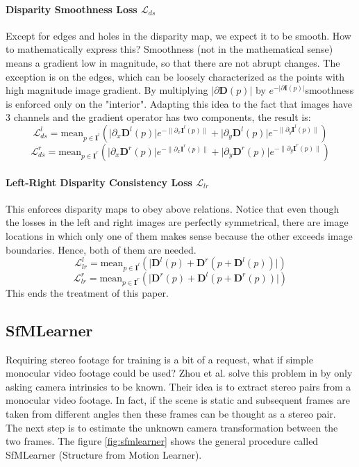 \paragraph{Disparity Smoothness Loss $\mathcal{L}_{ds}$} Except for edges and holes in the disparity map, we expect it to be smooth.
How to mathematically express this?
Smoothness (not in the mathematical sense) means a gradient low in magnitude, so that there are not abrupt changes.
The exception is on the edges, which can be loosely characterized as the points with high magnitude image gradient.
By multiplying $\big| \partial \mathbf{D}(p) \big|$ by $e^{- \big| \partial \mathbf{I}(p) \big| }$smoothness is enforced only on the "interior".
Adapting this idea to the fact that images have 3 channels and the gradient operator has two components, the result is:
\[
	\mathcal{L}_{ds}^{l} = \text{mean}_{p \in \mathbf{I}^{l}}
		\left(
			\big| \partial_{x} \mathbf{D}^{l}(p) \big| e^{-\big\| \partial_{x} \mathbf{I}^{l}(p) \big\| } + 
			\big| \partial_{y} \mathbf{D}^{l}(p) \big| e^{-\big\| \partial_{y} \mathbf{I}^{l}(p) \big\| }
		\right)
\]\[
	\mathcal{L}_{ds}^{r} = \text{mean}_{p \in \mathbf{I}^{r}}
		\left(
			\big| \partial_{x} \mathbf{D}^{r}(p) \big| e^{-\big\| \partial_{x} \mathbf{I}^{r}(p) \big\| } + 
			\big| \partial_{y} \mathbf{D}^{r}(p) \big| e^{-\big\| \partial_{y} \mathbf{I}^{r}(p) \big\| }
		\right)
\]

\paragraph{Left-Right Disparity Consistency Loss $\mathcal{L}_{lr}$} This enforces disparity maps to obey above relations.
Notice that even though the losses in the left and right images are perfectly symmetrical, there are image locations in which only one of them makes sense because the other exceeds image boundaries.
Hence, both of them are needed.
\[
	\mathcal{L}_{lr}^{l} = \text{mean}_{p \in \mathbf{I}^{l}}
		\left(
			\big| \mathbf{D}^{l}(p) + \mathbf{D}^{r}(p + \mathbf{D}^{l}(p)) \big|
		\right)
\]\[
	\mathcal{L}_{lr}^{r} = \text{mean}_{p \in \mathbf{I}^{r}}
		\left(
			\big| \mathbf{D}^{r}(p) + \mathbf{D}^{l}(p + \mathbf{D}^{r}(p)) \big|
		\right)
\]
This ends the treatment of this paper.

\subsection{SfMLearner}
Requiring stereo footage for training is a bit of a request, what if simple monocular video footage could be used?
Zhou et al. solve this problem in \cite{SfMLearner} by only asking camera intrinsics to be known.
Their idea is to extract stereo pairs from a monocular video footage.
In fact, if the scene is static and subsequent frames are taken from different angles then these frames can be thought as a stereo pair.
The next step is to estimate the unknown camera transformation between the two frames.
The figure \ref{fig:sfmlearner} shows the general procedure called SfMLearner (Structure from Motion Learner).

